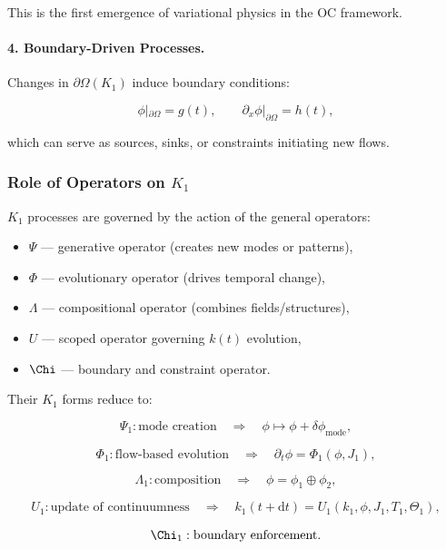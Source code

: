 This is the first emergence of variational physics in the OC framework.

\paragraph{4. Boundary-Driven Processes.}

Changes in $\partial\Omega(K_1)$ induce boundary conditions:

\[
\phi|_{\partial\Omega} = g(t),
\qquad
\partial_x\phi|_{\partial\Omega} = h(t),
\]

which can serve as sources, sinks, or constraints initiating new flows.

\subsubsection{Role of Operators on \texorpdfstring{$K_1$}{K_1}}

$K_1$ processes are governed by the action of the general operators:

\begin{itemize}
    \item $\Psi$ — generative operator (creates new modes or patterns),
    \item $\Phi$ — evolutionary operator (drives temporal change),
    \item $\Lambda$ — compositional operator (combines fields/structures),
    \item $U$ — scoped operator governing $k(t)$ evolution,
    \item $\Chi$ — boundary and constraint operator.
\end{itemize}

Their $K_1$ forms reduce to:

\[
\Psi_1: \text{mode creation}
\quad\Rightarrow\quad
\phi \mapsto \phi + \delta\phi_{\text{mode}},
\]

\[
\Phi_1: \text{flow-based evolution}
\quad\Rightarrow\quad
\partial_t \phi = \Phi_1(\phi,J_1),
\]

\[
\Lambda_1: \text{composition}
\quad\Rightarrow\quad
\phi = \phi_1 \oplus \phi_2,
\]

\[
U_1: \text{update of continuumness}
\quad\Rightarrow\quad
k_1(t+\mathrm{d}t) = U_1(k_1,\phi,J_1,T_1,\Theta_1),
\]

\[
\Chi_1: \text{boundary enforcement}.
\]

